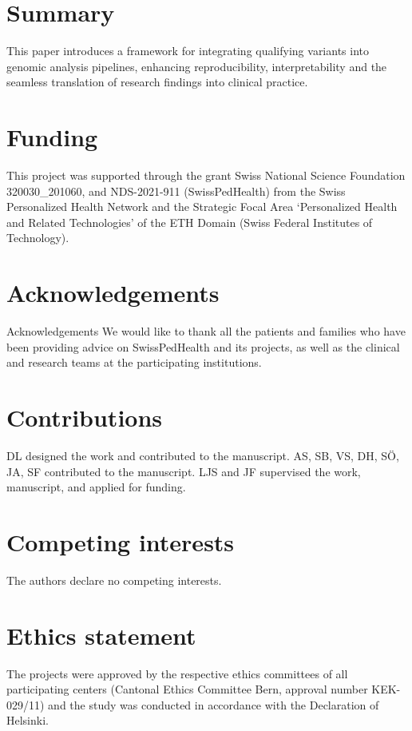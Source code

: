 \section{Summary}
This paper introduces a framework for integrating qualifying variants into genomic analysis pipelines, enhancing reproducibility, interpretability and the seamless translation of research findings into clinical practice.

\FloatBarrier

\section{Funding}
This project was supported through the grant Swiss National Science Foundation  320030\_201060, and NDS-2021-911 (SwissPedHealth) from the Swiss Personalized Health Network and the Strategic Focal Area `Personalized Health and Related Technologies' of the ETH Domain (Swiss Federal Institutes of Technology).

\section{Acknowledgements}
Acknowledgements We would like to thank all the patients and families who have been providing advice on SwissPedHealth and its projects, as well as the clinical and research teams at the participating institutions.

\section{Contributions}
DL designed the work and contributed to the manuscript.
AS, SB, VS, DH, SÖ, JA, SF contributed to the manuscript.
LJS and JF supervised the work, manuscript, and applied for funding.

\section{Competing interests}
The authors declare no competing interests.

\section{Ethics statement}
The projects were approved by the respective ethics committees of all participating centers (Cantonal Ethics Committee Bern, approval number KEK-029/11) and the study was conducted in accordance with the Declaration of Helsinki.

